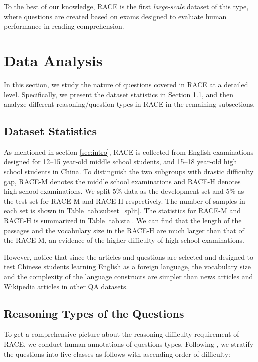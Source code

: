 To the best of our knowledge, RACE is the first \emph{large-scale} dataset of this type, where questions are created based on exams designed to evaluate human performance in reading comprehension.

\section{Data Analysis}
\label{sec:analysis}

In this section, we study the nature of questions covered in RACE at a detailed level. Specifically, we present the dataset statistics in Section \ref{sec:sta},
and then analyze different reasoning/question types in RACE in the remaining subsections.

\subsection{Dataset Statistics}
\label{sec:sta}
As mentioned in section \ref{sec:intro}, RACE is collected from English examinations designed for 12--15 year-old middle school students, and 15--18 year-old high school students in China. To distinguish the two subgroups with drastic difficulty gap, RACE-M denotes the middle school examinations and RACE-H denotes high school examinations. We split 5\% data as the development set and 5\% as the test set for RACE-M and RACE-H respectively. The number of samples in each set is shown in Table \ref{tab:subset_split}. The statistics for RACE-M and RACE-H is summarized in Table \ref{tab:sta}.
We can find that the length of the passages and the vocabulary size in the RACE-H are much larger than that of the RACE-M, an evidence of the higher difficulty of high school examinations. 

However, notice that since the articles and questions are selected and designed to test Chinese students learning English as a foreign language, the vocabulary size and the complexity of the language constructs are simpler than news articles and Wikipedia articles in other QA datasets. 

\subsection{Reasoning Types of the Questions}
\label{sec:reason}

To get a comprehensive picture about the reasoning difficulty requirement of RACE, we conduct human annotations of questions types. Following \citet{chen2016thorough,trischler2016newsqa}, we stratify the questions into five classes as follows with ascending order of difficulty:

